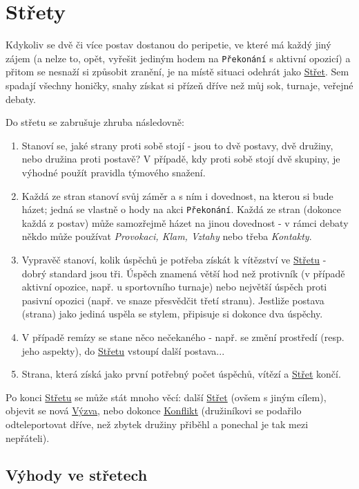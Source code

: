 \documentclass[../main.tex]{subfiles}
\begin{document}
\section{Střety}
\label{sec:strety}

Kdykoliv se dvě či více postav dostanou do peripetie, ve které má každý jiný zájem (a nelze to, opět, vyřešit jediným hodem na \texttt{Překonání} s aktivní opozicí) a přitom se nesnaží si způsobit zranění, je na místě situaci odehrát jako \underline{Střet}. Sem spadají všechny honičky, snahy získat si přízeň dříve než můj sok, turnaje, veřejné debaty.

Do střetu se zabrušuje zhruba následovně:
\begin{enumerate}
\item Stanoví se, jaké strany proti sobě stojí - jsou to dvě postavy, dvě družiny, nebo družina proti postavě? V případě, kdy proti sobě stojí dvě skupiny, je výhodné použít pravidla týmového snažení.
\item Každá ze stran stanoví svůj záměr a s ním i dovednost, na kterou si bude házet; jedná se vlastně o hody na akci \texttt{Překonání}. Každá ze stran (dokonce každá z postav) může samozřejmě házet na jinou dovednost - v rámci debaty někdo může používat \textit{Provokaci, Klam, Vztahy} nebo třeba \textit{Kontakty}. 

\item Vypravěč stanoví, kolik úspěchů je potřeba získát k vítězství ve \underline{Střetu} - dobrý standard jsou tři. Úspěch znamená větší hod než protivník (v případě aktivní opozice, např. u sportovního turnaje) nebo největší úspěch proti pasivní opozici (např. ve snaze přesvědčit třetí stranu). Jestliže postava (strana) jako jediná uspěla se stylem, připisuje si dokonce dva úspěchy.
\item V případě remízy se stane něco nečekaného - např. se změní prostředí (resp. jeho aspekty), do \underline{Střetu} vstoupí další postava...
\item Strana, která získá jako první potřebný počet úspěchů, vítězí a \underline{Střet} končí.
\end{enumerate}

Po konci \underline{Střetu} se může stát mnoho věcí: další \underline{Střet} (ovšem s jiným cílem), objevit se nová \underline{Výzva}, nebo dokonce \underline{Konflikt} (družiníkovi se podařilo odteleportovat dříve, než zbytek družiny přiběhl a ponechal je tak mezi nepřáteli).

\subsection{Výhody ve střetech}
\label{sec:výhody-střety}
\end{document}
